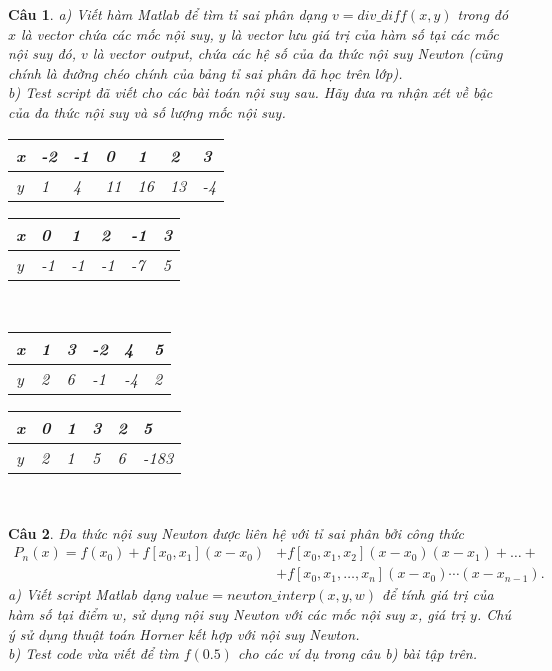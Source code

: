 \documentclass[11pt]{article}
\newtheorem{bt}{Câu}
\begin{document}
\begin{bt} a) Viết hàm Matlab để tìm tỉ sai phân dạng $v = div\_diff(x,y)$ trong đó $x$ là vector chứa các mốc nội suy, $y$ là vector lưu giá trị của hàm số tại các mốc nội suy đó, $v$ là vector output, chứa các hệ số của đa thức nội suy Newton (cũng chính là đường chéo chính của bảng tỉ sai phân đã học trên lớp). \\
b) Test script đã viết cho các bài toán nội suy sau. Hãy đưa ra nhận xét về bậc của đa thức nội suy và số lượng mốc nội suy.  \\
\begin{tabular}[7]{l|l|l|l|l|l|l}
	x & -2 & -1 & 0  & 1  & 2  & 3 \\ \hline 
	y & 1  & 4  & 11 & 16 & 13 & -4
\end{tabular}	
\hfill 
\begin{tabular}[6]{l|l|l|l|l|l}
	x & 0 & 1 & 2  & -1  & 3 \\ \hline 
	y & -1  & -1  & -1 & -7 & 5
\end{tabular}	\\
\begin{tabular}[6]{l|l|l|l|l|l}
	x & 1 & 3 & -2  & 4  & 5 \\ \hline 
	y & 2  & 6  & -1 & -4 & 2
\end{tabular}
\hfill 
\begin{tabular}[6]{l|l|l|l|l|l}
	x & 0 & 1 & 3  & 2  & 5 \\ \hline 
	y & 2  & 1  & 5 & 6 & -183
\end{tabular}\\
\end{bt}

\begin{bt}
Đa thức nội suy Newton được liên hệ với tỉ sai phân bởi công thức
%
\begin{align*}
P_n(x) = f(x_0)+f[x_0,x_1](x-x_0) &+f[x_0,x_1,x_2](x-x_0)(x-x_1)+ \dots + \\ 
&+ f[x_0,x_1,\dots,x_n](x-x_0)\cdots(x-x_{n-1}).
\end{align*}
%
a) Viết script Matlab dạng $value = newton\_interp(x,y,w)$ để tính giá trị của hàm số tại điểm $w$, sử dụng nội suy Newton với các mốc nội suy $x$, giá trị $y$. Chú ý sử dụng thuật toán Horner kết hợp với nội suy Newton. \\	
b) Test code vừa viết để tìm $f(0.5)$ cho các ví dụ trong câu b) bài tập trên. 
\end{bt}
\end{document}

